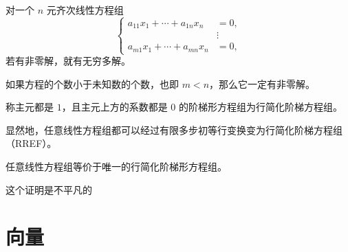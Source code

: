 对一个 $n$ 元齐次线性方程组
\[
\left\{
\begin{aligned}
	a_{11}x_1+\cdots+a_{1n}x_n&=0,\\
	&\vdots\\
	a_{m1}x_1+\cdots+a_{mn}x_n&=0,
\end{aligned}
\right.
\]
若有非零解，就有无穷多解。

如果方程的个数小于未知数的个数，也即 $m<n$，那么它一定有非零解。

\begin{definition}
	称主元都是 $1$，且主元上方的系数都是 $0$ 的阶梯形方程组为行简化阶梯方程组。
	
	显然地，任意线性方程组都可以经过有限多步初等行变换变为行简化阶梯方程组（RREF）。
\end{definition}

\begin{proposition}
	任意线性方程组等价于唯一的行简化阶梯形方程组。
\end{proposition}
这个证明是不平凡的




\section{向量}

